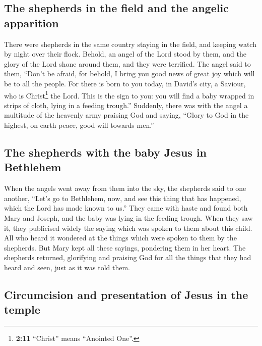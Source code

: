 \hypertarget{the-shepherds-in-the-field-and-the-angelic-apparition}{%
\subsection{The shepherds in the field and the angelic
apparition}\label{the-shepherds-in-the-field-and-the-angelic-apparition}}

 There were shepherds in the same country staying in the
field, and keeping watch by night over their flock. 
Behold, an angel of the Lord stood by them, and the glory of the Lord
shone around them, and they were terrified.  The angel
said to them, ``Don't be afraid, for behold, I bring you good news of
great joy which will be to all the people.  For there is
born to you today, in David's city, a Saviour, who is Christ\footnote{\textbf{2:11}
  ``Christ'' means ``Anointed One''.} the Lord.  This is
the sign to you: you will find a baby wrapped in strips of cloth, lying
in a feeding trough.''  Suddenly, there was with the
angel a multitude of the heavenly army praising God and saying,
 ``Glory to God in the highest, on earth peace, good will
towards men.''

\hypertarget{the-shepherds-with-the-baby-jesus-in-bethlehem}{%
\subsection{The shepherds with the baby Jesus in
Bethlehem}\label{the-shepherds-with-the-baby-jesus-in-bethlehem}}

 When the angels went away from them into the sky, the
shepherds said to one another, ``Let's go to Bethlehem, now, and see
this thing that has happened, which the Lord has made known to us.''
 They came with haste and found both Mary and Joseph, and
the baby was lying in the feeding trough.  When they saw
it, they publicised widely the saying which was spoken to them about
this child.  All who heard it wondered at the things
which were spoken to them by the shepherds.  But Mary
kept all these sayings, pondering them in her heart.  The
shepherds returned, glorifying and praising God for all the things that
they had heard and seen, just as it was told them.

\hypertarget{circumcision-and-presentation-of-jesus-in-the-temple}{%
\subsection{Circumcision and presentation of Jesus in the
temple}\label{circumcision-and-presentation-of-jesus-in-the-temple}}


